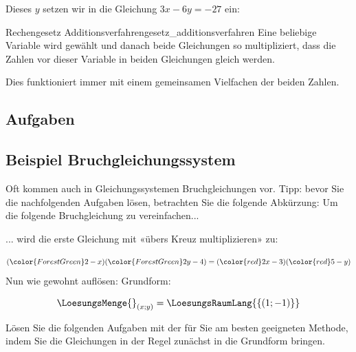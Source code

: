 

  Dieses $y$ setzen wir \zB in die Gleichung $3x-6y=-27$ ein:
\newpage


  \begin{rezept}{Rechengesetz Additionsverfahren}{gesetz_additionsverfahren}
    Eine beliebige Variable wird gewählt und danach beide Gleichungen so multipliziert,
    dass die Zahlen vor dieser Variable in beiden Gleichungen gleich werden.

    Dies funktioniert
    immer mit einem gemeinsamen Vielfachen der beiden Zahlen.
  \end{rezept}

\subsection*{Aufgaben}

\newpage

\subsection{Beispiel Bruchgleichungssystem}
Oft kommen auch in Gleichungssystemen Bruchgleichungen vor. Tipp:
bevor Sie die nachfolgenden Aufgaben lösen, betrachten Sie die folgende
Abkürzung: Um die folgende Bruchgleichung zu vereinfachen...

... wird die erste Gleichung mit «übers Kreuz multiplizieren» zu:

$$({\color{ForestGreen}2-x})({\color{ForestGreen}2y-4}) =
({\color{red}2x-3})({\color{red}5-y})$$
Nun wie gewohnt auflösen:
Grundform:

$$\LoesungsMenge{}_{(x;y)} = \LoesungsRaumLang{\{(1; -1)\}}$$

Lösen Sie die folgenden Aufgaben mit der für Sie am besten geeigneten Methode, indem Sie die
Gleichungen in der Regel zunächst in die Grundform bringen.

